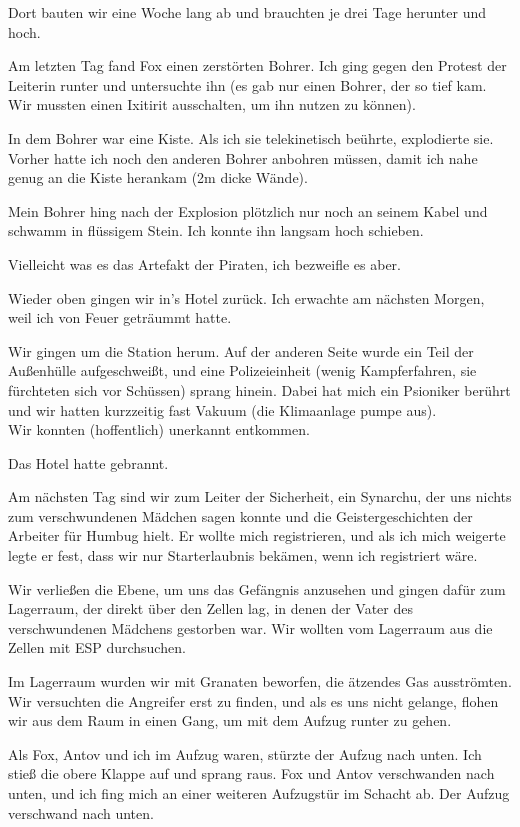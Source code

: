\documentclass[11pt]{article}
\begin{document}
Dort bauten wir eine Woche lang ab und brauchten je drei Tage herunter
und hoch.

Am letzten Tag fand Fox einen zerstörten Bohrer. Ich ging gegen den
Protest der Leiterin runter und untersuchte ihn (es gab nur einen
Bohrer, der so tief kam. Wir mussten einen Ixitirit ausschalten, um ihn
nutzen zu können).

In dem Bohrer war eine Kiste. Als ich sie telekinetisch beührte,
explodierte sie. Vorher hatte ich noch den anderen Bohrer anbohren
müssen, damit ich nahe genug an die Kiste herankam (2m dicke Wände).

Mein Bohrer hing nach der Explosion plötzlich nur noch an seinem Kabel
und schwamm in flüssigem Stein. Ich konnte ihn langsam hoch schieben.

Vielleicht was es das Artefakt der Piraten, ich bezweifle es aber.

Wieder oben gingen wir in's Hotel zurück. Ich erwachte am nächsten
Morgen, weil ich von Feuer geträummt hatte.

Wir gingen um die Station herum. Auf der anderen Seite wurde ein Teil
der Außenhülle aufgeschweißt, und eine Polizeieinheit (wenig
Kampferfahren, sie fürchteten sich vor Schüssen) sprang hinein. Dabei
hat mich ein Psioniker berührt und wir hatten kurzzeitig fast Vakuum
(die Klimaanlage pumpe aus).\\ Wir konnten (hoffentlich) unerkannt
entkommen.

Das Hotel hatte gebrannt.

Am nächsten Tag sind wir zum Leiter der Sicherheit, ein Synarchu, der
uns nichts zum verschwundenen Mädchen sagen konnte und die
Geistergeschichten der Arbeiter für Humbug hielt. Er wollte mich
registrieren, und als ich mich weigerte legte er fest, dass wir nur
Starterlaubnis bekämen, wenn ich registriert wäre.

Wir verließen die Ebene, um uns das Gefängnis anzusehen und gingen dafür
zum Lagerraum, der direkt über den Zellen lag, in denen der Vater des
verschwundenen Mädchens gestorben war. Wir wollten vom Lagerraum aus die
Zellen mit ESP durchsuchen.

Im Lagerraum wurden wir mit Granaten beworfen, die ätzendes Gas
ausströmten. Wir versuchten die Angreifer erst zu finden, und als es uns
nicht gelange, flohen wir aus dem Raum in einen Gang, um mit dem Aufzug
runter zu gehen.

Als Fox, Antov und ich im Aufzug waren, stürzte der Aufzug nach unten.
Ich stieß die obere Klappe auf und sprang raus. Fox und Antov
verschwanden nach unten, und ich fing mich an einer weiteren Aufzugstür
im Schacht ab. Der Aufzug verschwand nach unten.
\end{document}
